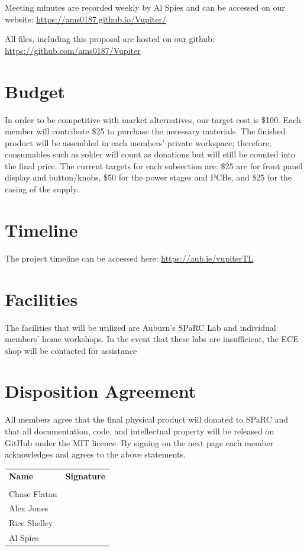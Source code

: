 \documentclass[12pt]{article}
\begin{document}
\noindent 
Meeting minutes are recorded weekly by Al Spies and can be accessed on our website: \url{https://ams0187.github.io/Vupiter/}

\noindent
All files, including this proposal are hosted on our github:\\
\url{https://github.com/ams0187/Vupiter}
\section{Budget}
In order to be competitive with market alternatives, our target cost is \$100. 
Each member will contribute \$25 to purchase the necessary materials. The finished product will
be assembled in each members’ private workspace; therefore, consumables such as solder will count as
donations but will still be counted into the final price. The current targets for each subsection
are: \$25 are for front panel display and button/knobs, \$50 for the power stages
and PCBs, and \$25 for the casing of the supply.

\section{Timeline}
The project timeline can be accessed here: \url{https://aub.ie/vupiterTL}
\section{Facilities}
The facilities that will be utilized are Auburn’s SPaRC Lab and individual members’ home workshops. In the event that these labs are insufficient, the ECE shop will be contacted for assistance
\section{Disposition Agreement}
All members agree that the final physical product will donated to SPaRC and that all documentation, code, and intellectual property will be released on GitHub under the MIT licence. By signing on the next page each member acknowledges and agrees to the above statements.
\newpage

\begin{table}[H]
\begin{tabular}{ l | c }
    \textbf{Name} & \textbf{Signature} \\
    & \\ [5ex]
    Chase Flatau &\\[10ex]
    Alex Jones &\\[10ex]
    Rice Shelley &\\[10ex]
    Al Spies &\\[10ex]

\end{tabular}
\end{table}
\end{document}
